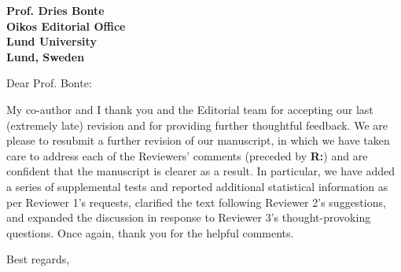 \documentclass[12pt]{letter}
\begin{document}
\begin{letter}{\bf Prof. Dries Bonte\\
Oikos Editorial Office \\
Lund University \\
Lund, Sweden}


\opening{Dear Prof. Bonte:}

    My co-author and I thank you and the Editorial team for accepting our last (extremely late) revision and for providing further thoughtful feedback.
    We are please to resubmit a further revision of our manuscript, in which we have taken care to address each of the Reviewers' comments (preceded by \textbf{R:}) and are confident that the manuscript is clearer as a result.
    In particular, we have added a series of supplemental tests and reported additional statistical information as per Reviewer 1's requests, clarified the text following Reviewer 2's suggestions, and expanded the discussion in response to Reviewer 3's thought-provoking questions. 
    Once again, thank you for the helpful comments.

    \closing{Best regards,}

    \clearpage















\end{letter}

\clearpage
    
 
\end{document}
